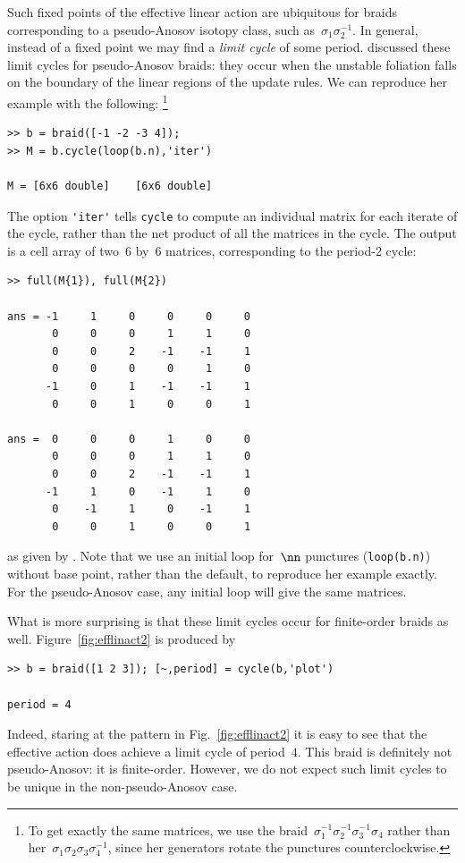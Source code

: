 \documentclass[12pt]{article}
\begin{document}
%
Such fixed points of the effective linear action are ubiquitous for braids
corresponding to a pseudo-Anosov isotopy class, such
as~$\sigma_1\sigma_2^{-1}$. %
In general, instead of a fixed point we may find a \emph{limit cycle} of some
period.  \citet{Yurttas2014_preprint} discussed these limit cycles for
pseudo-Anosov braids: they occur when the unstable foliation falls on the
boundary of the linear regions of the update rules.  We can reproduce her
example with the following:%
\footnote{To get exactly the same matrices, we use the
  braid~$\sigma_1^{-1}\sigma_2^{-1}\sigma_3^{-1}\sigma_4$ rather than
  her~$\sigma_1\sigma_2\sigma_3\sigma_4^{-1}$, since her generators rotate the
  punctures counterclockwise.}
%
\begin{lstlisting}[frame=single,framerule=0pt]
>> b = braid([-1 -2 -3 4]);
>> M = b.cycle(loop(b.n),'iter')

M = [6x6 double]    [6x6 double]
\end{lstlisting}
The option \lstinline{'iter'} tells \lstinline{cycle} to compute an individual
matrix for each iterate of the cycle, rather than the net product of all the
matrices in the cycle.  The output is a cell array %
%
of two~$6$ by~$6$ matrices, corresponding to the period-2 cycle:
\begin{lstlisting}[frame=single,framerule=0pt]
>> full(M{1}), full(M{2})

ans = -1     1     0     0     0     0
       0     0     0     1     1     0
       0     0     2    -1    -1     1
       0     0     0     0     1     0
      -1     0     1    -1    -1     1
       0     0     1     0     0     1

ans =  0     0     0     1     0     0
       0     0     0     1     1     0
       0     0     2    -1    -1     1
      -1     1     0    -1     1     0
       0    -1     1     0    -1     1
       0     0     1     0     0     1
\end{lstlisting}
as given by \citet{Yurttas2014_preprint}.  Note that we use an initial loop
for~$\nn$ punctures (\lstinline{loop(b.n)}) without base point, rather than
the default, to reproduce her example exactly.  For the pseudo-Anosov case,
any initial loop will give the same matrices.

What is more surprising is that these limit cycles occur for finite-order
braids as well.  Figure~\ref{fig:efflinact2} is produced by
\begin{lstlisting}[frame=single,framerule=0pt]
>> b = braid([1 2 3]); [~,period] = cycle(b,'plot')

period = 4
\end{lstlisting}
Indeed, staring at the pattern in Fig.~\ref{fig:efflinact2} it is easy to see
that the effective action does achieve a limit cycle of period~$4$.  This
braid is definitely not pseudo-Anosov: it is finite-order.
%
However, we do not expect such limit cycles to be unique in the
non-pseudo-Anosov case.
\end{document}
